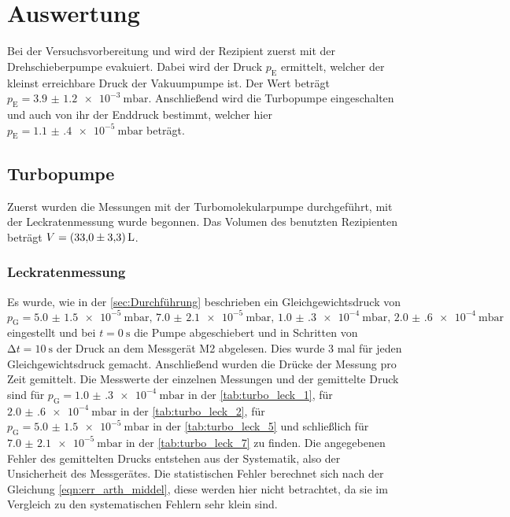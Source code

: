 \section{Auswertung}
\label{sec:Auswertung}

\noindent Bei der Versuchsvorbereitung und wird der Rezipient zuerst mit der Drehschieberpumpe evakuiert. Dabei wird der Druck $p_\text{E}$ ermittelt, welcher der kleinst erreichbare Druck 
der Vakuumpumpe ist. Der Wert beträgt $p_\text{E} = \SI{3.9(12)e-3}{\milli\bar}$. Anschließend wird die Turbopumpe eingeschalten und auch von ihr der Enddruck bestimmt, welcher hier 
$p_\text{E} = \SI{1.1(4)e-5}{\milli\bar}$ beträgt. 

\subsection{Turbopumpe}

  \noindent Zuerst wurden die Messungen mit der Turbomolekularpumpe durchgeführt, mit der Leckratenmessung wurde begonnen. Das Volumen des benutzten Rezipienten beträgt $V = \SI{33 \pm 3.3}{L}$. 
  
  \subsubsection{Leckratenmessung}

    \noindent Es wurde, wie in der \autoref{sec:Durchführung} beschrieben ein Gleichgewichtsdruck von $p_\text{G} = \SI{5.0(15)e-5}{\milli\bar}, \, \SI{7.0(21)e-5}{\milli\bar}, \,  \SI{1.0(3)e-4}{\milli\bar},\, \SI{2.0(6)e-4}{\milli\bar}$ eingestellt 
    und bei $t = \SI{0}{\second}$ die Pumpe abgeschiebert und in Schritten von $\increment t = \SI{10}{\second}$ der Druck an dem Messgerät M2 abgelesen. Dies wurde 3 mal für jeden 
    Gleichgewichtsdruck gemacht. Anschließend wurden die Drücke der Messung pro Zeit gemittelt. Die Messwerte der einzelnen Messungen und der gemittelte Druck sind für $p_\text{G} = \SI{1.0(3)e-4}{\milli\bar}$ in der \autoref{tab:turbo_leck_1}, für 
    $\SI{2.0(6)e-4}{\milli\bar}$ in der \autoref{tab:turbo_leck_2}, für $p_\text{G} = \SI{5.0(15)e-5}{\milli\bar}$ in der \autoref{tab:turbo_leck_5} und schließlich für $\SI{7.0(21)e-5}{\milli\bar}$ in der \autoref{tab:turbo_leck_7} zu finden. 
    Die angegebenen Fehler des gemittelten Drucks entstehen aus der Systematik, also der Unsicherheit des Messgerätes. Die statistischen Fehler berechnet sich nach der Gleichung \eqref{eqn:err_arth_middel}, diese werden hier nicht betrachtet, da 
    sie im Vergleich zu den systematischen Fehlern sehr klein sind.

